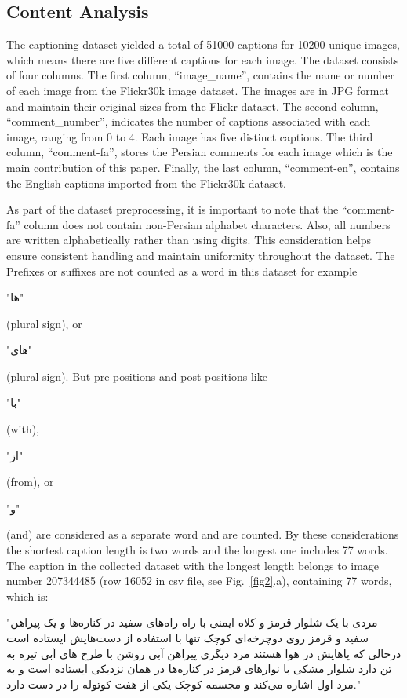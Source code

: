 \documentclass[runningheads]{llncs}
\begin{document}
\subsection{Content Analysis}
The captioning dataset yielded a total of 51000 captions for 10200 unique images, which means there are five different captions for each image. 
The dataset consists of four columns. The first column, ``image\_name'',
contains the name or number of each image from the Flickr30k image dataset. The images are in JPG format and maintain their original sizes from the Flickr dataset. The second column, ``comment\_number'', indicates the number of captions associated with each image, ranging from 0 to 4. Each image has five distinct captions. The third column, ``comment-fa'', stores the Persian comments for each image which is the main contribution of this paper. Finally, the last column, ``comment-en'', contains the English captions imported from the Flickr30k dataset.

As part of the dataset preprocessing, it is important to note that the ``comment-fa'' column does not contain non-Persian alphabet characters. Also, all numbers are written alphabetically rather than using digits. This consideration helps ensure consistent handling and maintain uniformity throughout the dataset. The Prefixes or suffixes are not counted as a word in this dataset for example \begin{farsi} \arabicfont\small "ها"\end{farsi} (plural sign), or \begin{farsi} \arabicfont\small "های"\end{farsi} (plural sign). But pre-positions and post-positions like \begin{farsi} \arabicfont\small "با"\end{farsi} (with), \begin{farsi} \arabicfont\small "از"\end{farsi} (from), or \begin{farsi} \arabicfont\small "و"\end{farsi} (and) are considered as a separate word and are counted. By these considerations the shortest caption length is two words and the longest one includes 77 words. The caption in the collected dataset with the longest length belongs to image number 207344485 (row 16052 in csv file, see Fig.~\ref{fig2}.a), containing 77 words, which is:

\begin{farsi}
\arabicfont\small
"مردی با یک شلوار قرمز و کلاه ایمنی با راه راه‌های سفید در کناره‌ها و یک پیراهن سفید و قرمز روی دوچرخه‌ای کوچک تنها با استفاده از دست‌هایش ایستاده است درحالی که پاهایش در هوا هستند مرد دیگری پیراهن آبی روشن با طرح های آبی تیره به تن دارد شلوار مشکی با نوارهای قرمز در کناره‌ها در همان نزدیکی ایستاده است و به مرد اول اشاره می‌کند و مجسمه کوچک یکی از هفت کوتوله را در دست دارد."
\end{farsi}
\end{document}
